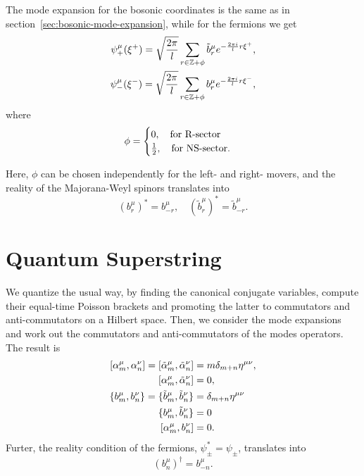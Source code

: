 The mode expansion for the bosonic coordinates is the same as in section~\ref{sec:bosonic-mode-expansion}, while for the fermions we get
\begin{equation}
\begin{aligned}
    \psi^\mu_+ (\xi^+) = \sqrt{\frac{2\pi}{l}} \sum_{r \in \mathbb{Z} + \phi} \tilde{b}^\mu_r e ^{-\frac{2\pi i}{l} r \xi^+} , \\
    \psi^\mu_- (\xi^-) = \sqrt{\frac{2\pi}{l}} \sum_{r \in \mathbb{Z} + \phi} {b}^\mu_r e ^{-\frac{2\pi i}{l} r \xi^-} ,
\end{aligned}
\end{equation}
where
\begin{equation}\label{eq:phi-sectors}
    \phi = \begin{cases}
        0, \quad \textup{for R-sector} \\
        \frac{1}{2}, \quad \textup{for NS-sector} .
    \end{cases}
\end{equation}

Here, $\phi$ can be chosen independently for the left- and right- movers, and the reality of the Majorana-Weyl spinors translates into
\begin{equation}
    (b^\mu_r)^* = b^\mu_{-r}, \quad (\tilde{b}^\mu_r)^* = \tilde{b}^\mu_{-r}.
\end{equation}

\section{Quantum Superstring}
We quantize the usual way, by finding the canonical conjugate variables, compute their equal-time Poisson brackets and promoting the latter to commutators and anti-commutators on a Hilbert space. Then, we consider the mode expansions and work out the commutators and anti-commutators of the modes operators. The result is
\begin{subequations}
\begin{align}
    \comm{\alpha^\mu_m}{\alpha^\nu_n} = \comm{\tilde{\alpha}^\mu_m}{\tilde{\alpha}^\nu_n} &= m \delta_{m+n} \eta^{\mu\nu} , \\
    \comm{\alpha^\mu_m}{\tilde{\alpha}^\nu_n} &= 0, \\
    \{ b^\mu_m, b^\nu_n \} = \{ \tilde{b}^\mu_m, \tilde{b}^\nu_n \} &= \delta_{m+n} \eta^{\mu\nu} \\
    \{ b^\mu_m, \tilde{b}^\nu_n \} &= 0 \\
    \comm{\alpha^\mu_m}{b^\nu_n} &= 0 .
\end{align}
\end{subequations}
Furter, the reality condition of the fermions, $\psi^*_\pm = \psi_\pm$, translates into
\begin{equation}
    (b^\mu_n)^\dagger = b^\mu_{-n} .
\end{equation}

